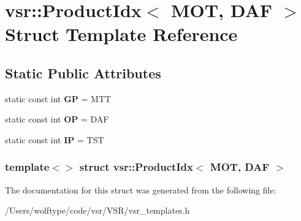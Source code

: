 \hypertarget{structvsr_1_1_product_idx_3_01_m_o_t_00_01_d_a_f_01_4}{\section{vsr\-:\-:Product\-Idx$<$ M\-O\-T, D\-A\-F $>$ Struct Template Reference}
\label{structvsr_1_1_product_idx_3_01_m_o_t_00_01_d_a_f_01_4}
}
\subsection*{Static Public Attributes}
\begin{DoxyCompactItemize}
\item 
\hypertarget{structvsr_1_1_product_idx_3_01_m_o_t_00_01_d_a_f_01_4_a3e0ed4f50937a2ec17a5a56c014acbfe}{static const int {\bfseries G\-P} = M\-T\-T}\label{structvsr_1_1_product_idx_3_01_m_o_t_00_01_d_a_f_01_4_a3e0ed4f50937a2ec17a5a56c014acbfe}

\item 
\hypertarget{structvsr_1_1_product_idx_3_01_m_o_t_00_01_d_a_f_01_4_a8d7eba68efb8732851a8fce6d3f91fcb}{static const int {\bfseries O\-P} = D\-A\-F}\label{structvsr_1_1_product_idx_3_01_m_o_t_00_01_d_a_f_01_4_a8d7eba68efb8732851a8fce6d3f91fcb}

\item 
\hypertarget{structvsr_1_1_product_idx_3_01_m_o_t_00_01_d_a_f_01_4_a45340ab8b108bf92eb20dc5ae53b5bdc}{static const int {\bfseries I\-P} = T\-S\-T}\label{structvsr_1_1_product_idx_3_01_m_o_t_00_01_d_a_f_01_4_a45340ab8b108bf92eb20dc5ae53b5bdc}

\end{DoxyCompactItemize}
\subsubsection*{template$<$$>$ struct vsr\-::\-Product\-Idx$<$ M\-O\-T, D\-A\-F $>$}



The documentation for this struct was generated from the following file\-:\begin{DoxyCompactItemize}
\item 
/\-Users/wolftype/code/vsr/\-V\-S\-R/vsr\-\_\-templates.\-h\end{DoxyCompactItemize}
